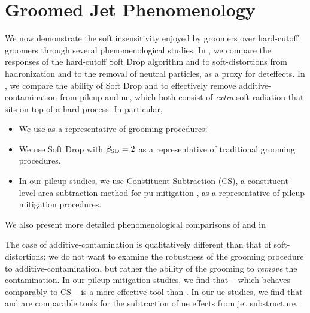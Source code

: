\section{Groomed Jet Phenomenology}
\label{sec:grooming-pheno}

We now demonstrate the soft insensitivity enjoyed by \PIRANHA{} groomers over hard-cutoff groomers through several phenomenological studies.
%
In , we compare the responses of the hard-cutoff Soft Drop algorithm and  to \glspl{soft-distortion} from \gls{hadronization} and to the removal of neutral particles, as a proxy for \gls{deteffects}.
%
In , we compare the ability of Soft Drop and  to effectively remove \gls{additive-contamination} from \gls{pileup} and \gls{ue}, which both consist of \textit{extra} soft radiation that sits on top of a hard process.
%
In particular,
\begin{itemize}
    \item
        We use  as a representative of \PIRANHA{} grooming procedures;

    \item
        We use Soft Drop with \(\beta_{\rm SD} = 2\) as a representative of traditional grooming procedures.

    \item
        In our \gls{pileup} studies, we use Constituent Subtraction (CS), a constituent-level area subtraction method for \gls{pu-mitigation} \cite{Berta:2014eza}, as a representative of \gls{pileup} mitigation procedures.
\end{itemize}
%
We also present more detailed phenomenological comparisons of \PIRANHA{} and  in 


The case of \gls{additive-contamination} is qualitatively different than that of \glspl{soft-distortion};
%
we do not want to examine the robustness of the grooming procedure to \gls{additive-contamination}, but rather the ability of the grooming to \textit{remove} the contamination.
%
In our \gls{pileup} mitigation studies, we find that  -- which behaves comparably to CS -- is a more effective tool than .
%
In our \gls{ue} studies, we find that  and  are comparable tools for the subtraction of \gls{ue} effects from jet substructure.

